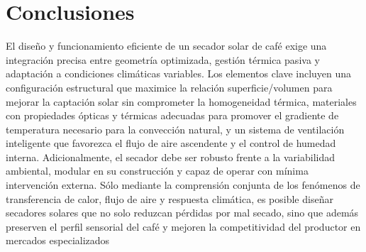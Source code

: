 \documentclass[12pt]{article}
\begin{document}
\clearpage

\section{Conclusiones}
El diseño y funcionamiento eficiente de un secador solar de café exige una integración precisa entre geometría optimizada, gestión térmica pasiva y adaptación a condiciones climáticas variables. Los elementos clave incluyen una configuración estructural que maximice la relación superficie/volumen para mejorar la captación solar sin comprometer la homogeneidad térmica, materiales con propiedades ópticas y térmicas adecuadas para promover el gradiente de temperatura necesario para la convección natural, y un sistema de ventilación inteligente que favorezca el flujo de aire ascendente y el control de humedad interna. Adicionalmente, el secador debe ser robusto frente a la variabilidad ambiental, modular en su construcción y capaz de operar con mínima intervención externa. Sólo mediante la comprensión conjunta de los fenómenos de transferencia de calor, flujo de aire y respuesta climática, es posible diseñar secadores solares que no solo reduzcan pérdidas por mal secado, sino que además preserven el perfil sensorial del café y mejoren la competitividad del productor en mercados especializados

\clearpage


\end{document}
